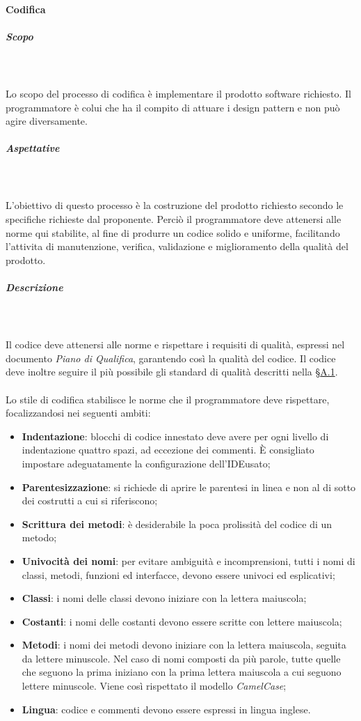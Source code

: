 	\paragraph{Codifica}
		\subparagraph*{Scopo}\mbox{} \\ \mbox{} \\
		Lo scopo del processo di codifica è implementare il prodotto software richiesto. Il programmatore è colui che ha il compito di attuare i design pattern e non può agire diversamente.
		\subparagraph*{Aspettative}\mbox{} \\ \mbox{} \\
		L'obiettivo di questo processo è la costruzione del prodotto richiesto secondo le specifiche richieste dal proponente. Perciò il programmatore deve attenersi alle norme qui stabilite, al fine di produrre un codice solido e uniforme, facilitando l'attivita di manutenzione, verifica, validazione e miglioramento della qualità del prodotto.
		\subparagraph*{Descrizione}\mbox{} \\ \mbox{} \\
		Il codice deve attenersi alle norme e rispettare i requisiti di qualità, espressi nel documento \textit{Piano di Qualifica}, garantendo così la qualità del codice. Il codice deve inoltre seguire il più possibile gli standard di qualità descritti nella \S \hyperref[sez:9126]{A.1}.
		 \mbox{} \\ \mbox{} \\
		Lo stile di codifica stabilisce le norme che il programmatore deve rispettare, focalizzandosi nei seguenti ambiti:
		\begin{itemize}
			\item \textbf{Indentazione}: blocchi di codice innestato deve avere per ogni livello di indentazione quattro spazi, ad eccezione dei commenti. È consigliato impostare adeguatamente la configurazione dell'IDE\glo usato;
			\item \textbf{Parentesizzazione}: si richiede di aprire le parentesi in linea e non al di sotto dei costrutti a cui si riferiscono;
			\item \textbf{Scrittura dei metodi}: è desiderabile la poca prolissità del codice di un metodo;
			\item \textbf{Univocità dei nomi}: per evitare ambiguità e incomprensioni, tutti i nomi di classi, metodi, funzioni ed interfacce, devono essere univoci ed esplicativi;
			\item \textbf{Classi}: i nomi delle classi devono iniziare con la lettera maiuscola;
			\item \textbf{Costanti}: i nomi delle costanti devono essere scritte con lettere maiuscola;
			\item \textbf{Metodi}: i nomi dei metodi devono iniziare con la lettera maiuscola, seguita da lettere minuscole. Nel caso di nomi composti da più parole, tutte quelle che seguono la prima iniziano con la prima lettera maiuscola a cui seguono lettere minuscole. Viene così rispettato il modello \textit{CamelCase}\glo;
			\item \textbf{Lingua}: codice e commenti devono essere espressi in lingua inglese.
		\end{itemize}
